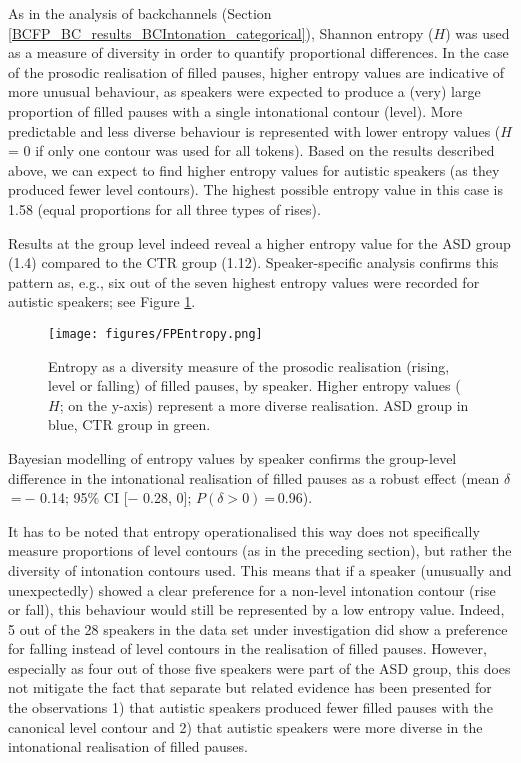\label{BCFP_FP_results_intonation_entropy}

As in the analysis of backchannels (Section \ref{BCFP_BC_results_BCIntonation_categorical}), Shannon entropy (\(H\)) was used as a measure of diversity in order to quantify proportional differences. In the case of the prosodic realisation of filled pauses, higher entropy values are indicative of more unusual behaviour, as speakers were expected to produce a (very) large proportion of filled pauses with a single intonational contour (level). More predictable and less diverse behaviour is represented with lower entropy values (\(H\) = 0 if only one contour was used for all tokens). Based on the results described above, we can expect to find higher entropy values for autistic speakers (as they produced fewer level contours). The highest possible entropy value in this case is 1.58 (equal proportions for all three types of rises).

Results at the group level indeed reveal a higher entropy value for the ASD group (1.4) compared to the CTR group (1.12). Speaker-specific analysis confirms this pattern as, e.g., six out of the seven highest entropy values were recorded for autistic speakers; see Figure \ref{fig:FPEntropy}.

\begin{figure}

\texttt{[image: figures/FPEntropy.png]} \hfill{}

\caption{Entropy as a diversity measure of the prosodic realisation (rising, level or falling) of filled pauses, by speaker. Higher entropy values (\(H\); on the y-axis) represent a more diverse realisation. ASD group in blue, CTR group in green.}\label{fig:FPEntropy}
\end{figure}

\newpage
Bayesian modelling of entropy values by speaker confirms the group-level difference in the intonational realisation of filled pauses as a robust effect (mean \(\delta\) = − 0.14; 95\% CI {[}− 0.28, 0{]}; \(P(\delta > 0)\) = 0.96).

It has to be noted that entropy operationalised this way does not specifically measure proportions of level contours (as in the preceding section), but rather the diversity of intonation contours used. This means that if a speaker (unusually and unexpectedly) showed a clear preference for a non-level intonation contour (rise or fall), this behaviour would still be represented by a low entropy value. Indeed, 5 out of the 28 speakers in the data set under investigation did show a preference for falling instead of level contours in the realisation of filled pauses. However, especially as four out of those five speakers were part of the ASD group, this does not mitigate the fact that separate but related evidence has been presented for the observations 1) that autistic speakers produced fewer filled pauses with the canonical level contour and 2) that autistic speakers were more diverse in the intonational realisation of filled pauses.

